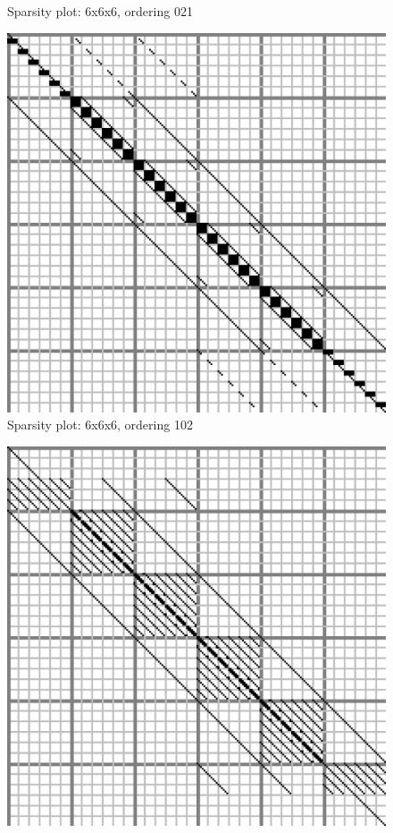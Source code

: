 \documentclass[10pt]{article}
\begin{document}
\begin{multicols}{2}
\begin{center}
\begin{minipage}[t]{.5\textwidth}
\begin{figure}[H]
	\caption{Sparsity plot: 6x6x6, ordering 021 }
\end{figure}
\vspace{\spmgin}
\begin{figure}[H]
	\centering
	\includegraphics[width=\spwidth]{../img/sparsity/int_small_6x6x6_102.eps}
	\caption{Sparsity plot: 6x6x6, ordering 102 }
\end{figure}
\end{minipage}%
\begin{minipage}[t]{.5\textwidth}%
\begin{figure}[H]
	\centering
	\includegraphics[width=\spwidth]{../img/sparsity/int_small_6x6x6_120.eps}

\end{figure}
\end{minipage}
\end{center}
\end{multicols}
\end{document}
